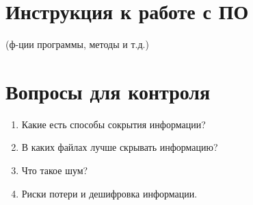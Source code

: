 \section{Инструкция к работе с ПО}\label{sect6_c}
%
(ф-ции программы, методы и т.д.)
\section{Вопросы для контроля}\label{sect6_e}
%
\begin{enumerate}
  \item Какие есть способы сокрытия информации?
  \item В каких файлах лучше скрывать информацию?
  \item Что такое шум?
  \item Риски потери и дешифровка информации.
\end{enumerate}
